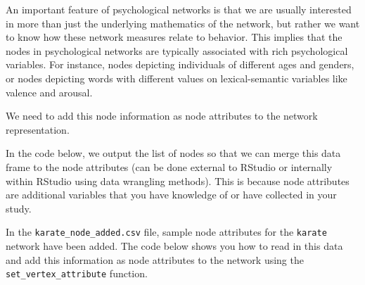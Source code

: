 \documentclass[
]{book}
\newenvironment{Shaded}{\begin{snugshade}}{\end{snugshade}}
\newcommand{\AttributeTok}[1]{\textcolor[rgb]{0.13,0.29,0.53}{#1}}
\newcommand{\CommentTok}[1]{\textcolor[rgb]{0.56,0.35,0.01}{\textit{#1}}}
\newcommand{\FunctionTok}[1]{\textcolor[rgb]{0.13,0.29,0.53}{\textbf{#1}}}
\newcommand{\NormalTok}[1]{#1}
\newcommand{\OtherTok}[1]{\textcolor[rgb]{0.56,0.35,0.01}{#1}}
\newcommand{\SpecialCharTok}[1]{\textcolor[rgb]{0.81,0.36,0.00}{\textbf{#1}}}
\newcommand{\StringTok}[1]{\textcolor[rgb]{0.31,0.60,0.02}{#1}}
\begin{document}
An important feature of psychological networks is that we are usually interested in more than just the underlying mathematics of the network, but rather we want to know how these network measures relate to behavior. This implies that the nodes in psychological networks are typically associated with rich psychological variables. For instance, nodes depicting individuals of different ages and genders, or nodes depicting words with different values on lexical-semantic variables like valence and arousal.

We need to add this node information as node attributes to the network representation.

In the code below, we output the list of nodes so that we can merge this data frame to the node attributes (can be done external to RStudio or internally within RStudio using data wrangling methods). This is because node attributes are additional variables that you have knowledge of or have collected in your study.

\begin{Shaded}
\end{Shaded}

In the \texttt{karate\_node\_added.csv} file, sample node attributes for the \texttt{karate} network have been added. The code below shows you how to read in this data and add this information as node attributes to the network using the \texttt{set\_vertex\_attribute} function.

\begin{Shaded}
\end{Shaded}
\end{document}
